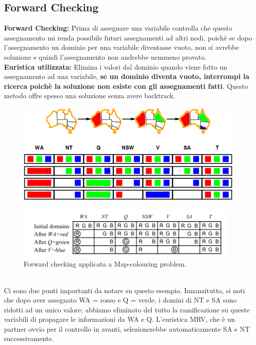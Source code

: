 \subsection{Forward Checking}
\textbf{Forward Checking: }  Prima di assegnare una variabile controlla che questo assegnamento mi renda possibile futuri assegnamenti ad altri nodi, poichè se dopo l’assegnamento un dominio per una variabile diventasse vuoto, non si avrebbe soluzione e quindi l’assegnamento non andrebbe nemmeno provato.
\\\textbf{Euristica utilizzata: }  Elimina i valori dal dominio quando viene fatto un
assegnamento ad una variabile, \textbf{se un dominio diventa vuoto, interrompi la ricerca poichè la soluzione non esiste con gli assegnamenti fatti}. Questo metodo offre spesso una soluzione senza avere backtrack.
\begin{figure}[htp]
    \centering
    \includegraphics[width=12cm, keepaspectratio]{latex/img/Cap2/forwod1.png}
\end{figure}
\begin{figure}[htp]
    \centering
    \includegraphics[width=11cm, keepaspectratio]{img/Cap2/f2.png}
    \caption{Forward checking applicata a Map-colouring problem.}
\end{figure}
\\Ci sono due punti importanti da notare su questo esempio. Innanzitutto, si noti che dopo aver assegnato WA = rosso e Q = verde, i domini di NT e SA sono ridotti ad un unico valore; abbiamo eliminato del tutto la ramificazione su queste variabili di propagare le informazioni da WA e Q. L’euristica MRV, che è un partner ovvio per il controllo in avanti, selezionerebbe automaticamente SA e NT successivamente.
